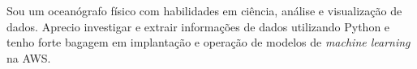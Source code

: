 \documentclass[9pt]{developercv} %
\begin{document}

\begin{minipage}[t]{1\textwidth} %
Sou um oceanógrafo físico com habilidades em ciência, análise e visualização de dados. Aprecio investigar e extrair informações de dados utilizando Python e tenho forte bagagem em implantação e operação de modelos de \textit{machine learning} na AWS. 
\end{minipage}
\hspace{0.3cm}
\hfill %

\begin{center}
\end{center}

\vspace{-0.2cm}
\end{document}
